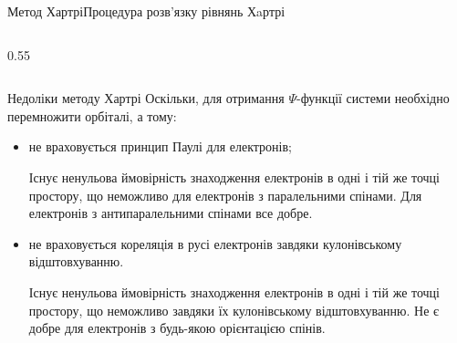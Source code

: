 \documentclass[10pt]{beamer}
\begin{document}
\begin{frame}{Метод Хартрі}{Процедура розв'язку рівнянь Хaртрі}
\begin{columns}[T]
\begin{column}{0.55\linewidth}
		\end{column}
	\end{columns}
\end{frame}





\begin{frame}{Недоліки методу Хартрі}{}
	Оскільки, для отримання $\Psi$-функції системи необхідно перемножити орбіталі, а тому:
	\begin{itemize}
		\item не враховується принцип Паулі для електронів;

		      {\footnotesize Існує ненульова ймовірність знаходження електронів в одні і тій же точці простору, що неможливо для електронів з паралельними спінами. Для електронів з антипаралельними спінами все добре.}
		\item не враховується кореляція в русі електронів завдяки кулонівському відштовхуванню.

		      {\footnotesize  Існує ненульова ймовірність знаходження електронів в одні і тій же точці простору, що неможливо завдяки їх кулонівському відштовхуванню. Не є добре для електронів з будь-якою орієнтацією спінів.}
	\end{itemize}
\end{frame}
\end{document}
